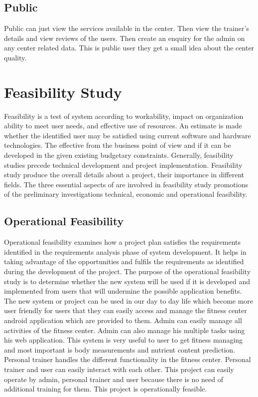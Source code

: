 \documentclass[a4paper,12pt,toc=flat]{report}
\begin{document}
{	\subsection{ Public}
	Public can just view the services available in the center. Then view the trainer’s details and view reviews of the users. Then create an enquiry for the admin on any center related data. This is public user they get a small idea about the center quality.
	\pagebreak
	\section{Feasibility Study}
	Feasibility is a test of system according to workability, impact on organization ability to
	meet user needs, and effective use of resources. An estimate is made whether the identified
	user may be satisfied using current software and hardware technologies. The effective
	from the business point of view and if it can be developed in the given existing budgetary
	constraints. Generally, feasibility studies precede technical development and project implementation. Feasibility study produce the overall details about a project, their importance in different fields. The three essential aspects of are involved in feasibility study promotions
	of the preliminary investigations technical, economic and operational feasibility.
	
	\subsection{Operational Feasibility}
	
	Operational feasibility examines how a project plan satisfies the requirements identified in
	the requirements analysis phase of system development. It helps in taking advantage of
	the opportunities and fulfils the requirements as identified during the development of the
	project. The purpose of the operational feasibility study is to determine whether the new
	system will be used if it is developed and implemented from users that will undermine the
	possible application benefits. The new system or project can be used in our day to day
	life which become more user friendly for users that they can easily access and manage the fitness center   android application which are provided to them. Admin can easily manage all activities of the fitness center. Admin can also manage his multiple tasks using his web application. This system is very useful to user to get fitness managing and most important is body measurements and nutrient content prediction. Personal trainer handles the different functionality in the fitness center. Personal trainer and user can easily interact with each other. This project can easily operate by admin, personal trainer and user because there is no need of additional training for them. This project is operationally feasible.
	
}
\end{document}
